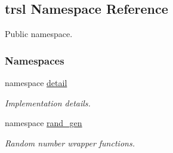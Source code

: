 \hypertarget{namespacetrsl}{
\subsection{trsl Namespace Reference}
\label{namespacetrsl}
}


Public namespace.  
\subsubsection*{Namespaces}
\begin{DoxyCompactItemize}
\item 
namespace \hyperlink{namespacetrsl_1_1detail}{detail}


\begin{DoxyCompactList}\small\item\em Implementation details. \item\end{DoxyCompactList}\item 
namespace \hyperlink{namespacetrsl_1_1rand__gen}{rand\_\-gen}


\begin{DoxyCompactList}\small\item\em Random number wrapper functions. \item\end{DoxyCompactList}\end{DoxyCompactItemize}
